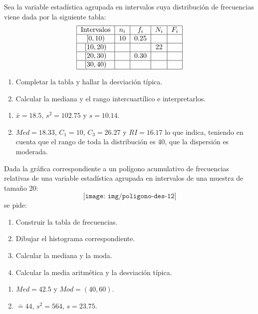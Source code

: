 {Sea la variable estadística agrupada en intervalos cuya distribución de frecuencias viene dada por la siguiente tabla:
\[
\begin{tabular}{|c|c|c|c|c|}
\hline
Intervalos & $n_{i}$ & $f_{i}$ & $N_{i}$ & $F_{i}$ \\ \hline
$\left[ 0,10\right) $ & 10 & 0.25 &  &  \\ \hline
$\left[ 10,20\right) $ &  &  & 22 &  \\ \hline
$\left[ 20,30\right) $ &  & 0.30 &  &  \\ \hline
$\left[ 30,40\right) $ &  &  &  &  \\ \hline
\end{tabular}
\]
\begin{enumerate}
\item  Completar la tabla y hallar la desviación típica.
\item  Calcular la mediana y el rango intercuartílico e interpretarlos.
\end{enumerate}
}
{\begin{enumerate}
\item $\bar{x}= 18.5$, $s^2=102.75$ y $s=10.14$.
\item $Med = 18.33$, $C_1=10$, $C_3 = 26.27$ y $RI= 16.17$ lo que indica, teniendo en cuenta que el rango de toda la distribución es 40, que la dispersión es moderada.
\end{enumerate}
}
{}


{Dada la gráfica correspondiente a un polígono acumulativo de frecuencias relativas de una variable estadística agrupada en intervalos de una muestra de tamaño 20:
\[
\texttt{[image: img/poligono-des-12]}
\]
se pide:
\begin{enumerate}
\item Construir la tabla de frecuencias.
\item Dibujar el histograma correspondiente.
\item Calcular la mediana y la moda.
\item Calcular la media aritmética y la desviación típica.
\end{enumerate}
}
{\begin{enumerate}[start=3]
\item $Med =42.5$ y $Mod= (40,60)$.
\item $\bar = 44$, $s^2 = 564$, $s= 23.75$.
\end{enumerate}
}
{}


